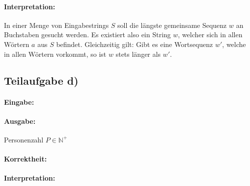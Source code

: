 \documentclass[12pt]{scrartcl}%
\theoremstyle{nonumberplain}
\newcommand{\N}{\mathbb{N}}
\begin{document}
\paragraph{Interpretation:}
In einer Menge von Eingabestrings $S$ soll die längste gemeinsame Sequenz $w$ an Buchstaben gesucht werden. Es existiert also ein String $w$, welcher sich in allen Wörtern $a$ aus $S$ befindet. Gleichzeitig gilt: Gibt es eine Wortsequenz $w'$, welche in allen Wörtern vorkommt, so ist $w$ stets länger als $w'$.

\subsection*{Teilaufgabe d)}

\paragraph{Eingabe:}
\paragraph{Ausgabe:} Personenzahl $P \in \N^+$
\paragraph{Korrektheit:}
\paragraph{Interpretation:}
\end{document}
